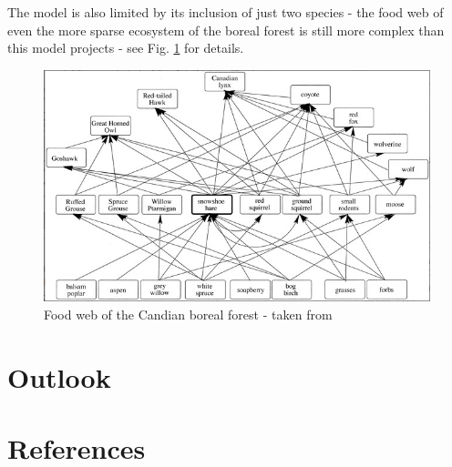 \documentclass{article}
\begin{document}
The model is also limited by its inclusion of just two species - the food web of even the more sparse ecosystem of the boreal forest is still more complex than this model projects \parencite{stenseth_population_1997} - see Fig. \ref{fig:food_web} for details.

\begin{figure}[H]
    \includegraphics[width = \textwidth]{food_web.PNG}
    \caption{Food web of the Candian boreal forest - taken from \parencite{king_geometry_2001}}
    \label{fig:food_web}
\end{figure}

\section{Outlook}

\clearpage
\section{References}
\printbibliography
\end{document}
